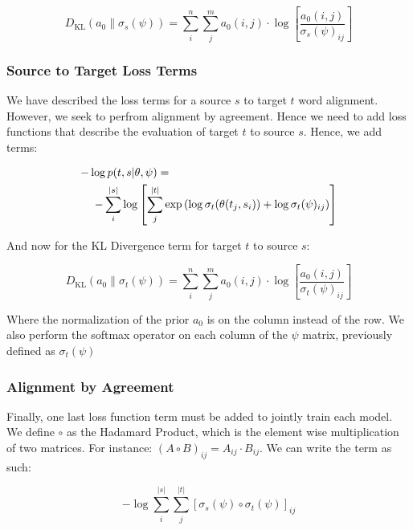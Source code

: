 \documentclass[twoside,twocolumn]{article}
\begin{document}
\begin{equation}
  D_{\mathrm{KL}} ( a_0 \| \sigma_s(\psi) ) = \sum_i^n \sum_j^m a_0(i, j) \cdot \log \left[ \frac{a_0(i, j)}{\sigma_s(\psi)_{ij}} \right]
\end{equation}



\subsubsection{Source to Target Loss Terms}
We have described the loss terms for a source $s$ to target $t$ word alignment. However, we seek to perfrom alignment by agreement. Hence we need to add loss functions that describe the evaluation of target $t$ to source $s$. Hence, we add terms:

\begin{equation}
  \centering
  \begin{split}
  -\log  p(t & , s | \theta, \psi) = \\
  - \sum_i^{|s|} & \log \left[ \sum_j^{|t|} \exp \left( \log \sigma_t(\theta(t_j, s_i)) + \log \sigma_t(\psi)_{ij} \right) \right]
\end{split}
\end{equation}

And now for the KL Divergence term for target $t$ to source $s$:

\begin{equation}
  D_{\mathrm{KL}} ( a_0 \| \sigma_t(\psi) ) = \sum_i^n \sum_j^m a_0(i, j) \cdot \log \left[ \frac{a_0(i, j)}{\sigma_t(\psi)_{ij}} \right]
\end{equation}

Where the normalization of the prior $a_0$ is on the column instead of the row. We also perform the softmax operator on each column of the $\psi$ matrix, previously defined as $\sigma_t(\psi)$

\subsubsection{Alignment by Agreement}
Finally, one last loss function term must be added to jointly train each model. We define $\circ$ as the Hadamard Product, which is the element wise multiplication of two matrices. For instance: $(A \circ B)_{ij} = A_{ij} \cdot B_{ij}$. We can write the term as such:

\begin{equation}
  -\log \sum_i^{|s|} \sum_j^{|t|} \left[ \sigma_s(\psi) \circ \sigma_t(\psi) \right]_{ij}
\end{equation}
\end{document}
